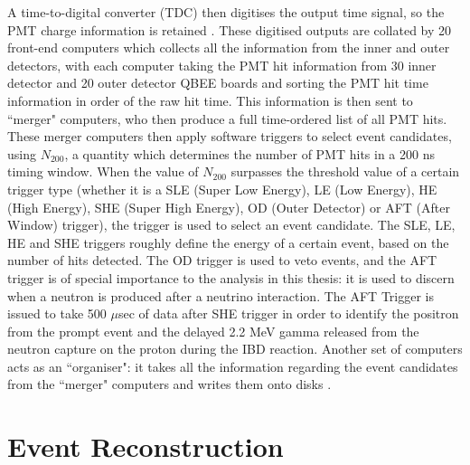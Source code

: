 A time-to-digital converter (TDC) then digitises the output time signal, so the PMT charge information is retained \cite{nishino_high-speed_2009}. These digitised outputs are collated by 20 front-end computers which collects all the information from the inner and outer detectors, with each computer taking the PMT hit information from 30 inner detector and 20 outer detector QBEE boards and sorting the PMT hit time information in order of the raw hit time. This information is then sent to ``merger" computers, who then produce a full time-ordered list of all PMT hits. These merger computers then apply software triggers to select event candidates, using $N_{200}$, a quantity which determines the number of PMT hits in a 200 ns timing window. When the value of $N_{200}$ surpasses the threshold value of a certain trigger type (whether it is a SLE (Super Low Energy), LE (Low Energy), HE (High Energy), SHE (Super High Energy), OD (Outer Detector) or AFT (After Window) trigger), the trigger is used to select an event candidate. The SLE, LE, HE and SHE triggers roughly define the energy of a certain event, based on the number of hits detected. The OD trigger is used to veto events, and the AFT trigger is of special importance to the analysis in this thesis: it is used to discern when a neutron is produced after a neutrino interaction. The AFT Trigger is issued to take 500 $\mu$sec of data after SHE trigger in order to identify the positron from the prompt event and the delayed 2.2 MeV gamma released from the neutron capture on the proton during the IBD reaction. Another set of computers acts as an ``organiser": it takes all the information regarding the event candidates from the ``merger" computers and writes them onto disks \cite{fukuda_super-kamiokande_2003}.


\section{Event Reconstruction}


